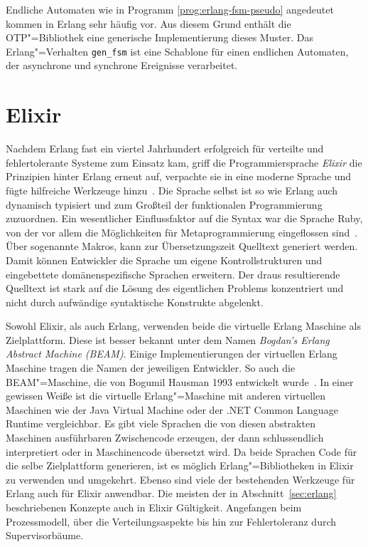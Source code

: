 Endliche Automaten wie in Programm \ref{prog:erlang-fsm-pseudo} angedeutet kommen in Erlang sehr häufig vor. Aus diesem Grund enthält die OTP"=Bibliothek eine generische Implementierung dieses Muster. Das Erlang"=Verhalten \lstinline{gen_fsm} ist eine Schablone für einen endlichen Automaten, der asynchrone und synchrone Ereignisse verarbeitet.

\section{Elixir}

Nachdem Erlang fast ein viertel Jahrhundert erfolgreich für verteilte und fehlertolerante Systeme zum Einsatz kam, griff die Programmiersprache \textit{Elixir} die Prinzipien hinter Erlang erneut auf, verpachte sie in eine moderne Sprache und fügte hilfreiche Werkzeuge hinzu~\cite[9-10]{Loder2016}. Die Sprache selbst ist so wie Erlang auch dynamisch typisiert und zum Großteil der funktionalen Programmierung zuzuordnen. Ein wesentlicher Einflussfaktor auf die Syntax war die Sprache Ruby, von der vor allem die Möglichkeiten für Metaprogrammierung eingeflossen sind~\cite{ValimGoto2014}. Über sogenannte Makros, kann zur Übersetzungszeit Quelltext generiert werden. Damit können Entwickler die Sprache um eigene Kontrollstrukturen und eingebettete domänenspezifische Sprachen erweitern. Der draus resultierende Quelltext ist stark auf die Lösung des eigentlichen Problems konzentriert und nicht durch aufwändige syntaktische Konstrukte abgelenkt.

Sowohl Elixir, als auch Erlang, verwenden beide die virtuelle Erlang Maschine als Zielplattform. Diese ist besser bekannt unter dem Namen \textit{Bogdan's Erlang Abstract Machine (BEAM)}. Einige Implementierungen der virtuellen Erlang Maschine tragen die Namen der jeweiligen Entwickler. So auch die BEAM"=Maschine, die von Bogumil Hausman 1993 entwickelt wurde~\cite[12]{Armstrong:2007:HE:1238844.1238850}. In einer gewissen Weiße ist die virtuelle Erlang"=Maschine mit anderen virtuellen Maschinen wie der Java Virtual Machine oder der .NET Common Language Runtime vergleichbar. Es gibt viele Sprachen die von diesen abstrakten Maschinen ausführbaren Zwischencode erzeugen, der dann schlussendlich interpretiert oder in Maschinencode übersetzt wird.
Da beide Sprachen Code für die selbe Zielplattform generieren, ist es möglich Erlang"=Bibliotheken in Elixir zu verwenden und umgekehrt. Ebenso sind viele der bestehenden Werkzeuge für Erlang auch für Elixir anwendbar. Die meisten der in Abschnitt~\ref{sec:erlang} beschriebenen Konzepte auch in Elixir Gültigkeit. Angefangen beim Prozessmodell, über die Verteilungsaspekte bis hin zur Fehlertoleranz durch Supervisorbäume.

